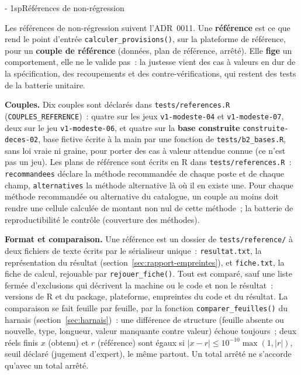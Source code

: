 \documentclass[a4paper,11pt]{article}
\makeatletter
\newcommand{\titrebandeau}[1]{%
  \noindent{\color{financeblue}\rule{\linewidth}{2.5pt}}
  \par\vspace{5mm}
  {\color{greenline}\raggedright\fontsize{19}{23}\bfseries\selectfont #1\par}
  \vspace{6mm}}
\newcommand{\charte@bandeau}[1]{%
  \parindent\z@ \everypar{\strut}%
  {\strut\par}\nobreak
  \titrebandeau{#1}\nobreak
  \kern\z@\nobreak\strut\par}
\newcommand{\charte@reserve}[1]{\par\ifinner\else\if@nobreak\else
  \penalty\z@ %
  \begingroup\setlength{\dimen@}{#1}%
  \dimen@ii\pagegoal \advance\dimen@ii-\pagetotal
  \ifdim\pagegoal=\maxdimen\else\ifdim\dimen@>\dimen@ii
    \vfil\penalty-\@M %
  \fi\fi\endgroup\fi\fi}
\renewcommand{\section}{\charte@reserve{12\baselineskip}%
  \@startsection{section}{1}{\z@}%
  {\z@}{1sp}{\normalfont\charte@bandeau}}
\newcommand{\code}[1]{\texttt{\small #1}}
\makeatother
\begin{document}
\section{Références de non-régression}
\label{sec:references}

Les références de non-régression suivent l'ADR~0011. Une \textbf{référence}
est ce que rend le point d'entrée \code{calculer\_provisions()}, sur la plateforme de
référence, pour un \textbf{couple de référence} (données, plan de
référence, arrêté). Elle \textbf{fige} un comportement, elle ne le valide
pas~: la justesse vient des cas à valeurs en dur de la spécification, des
recoupements et des contre-vérifications, qui restent des tests de la
batterie unitaire.

\textbf{Couples.} Dix couples sont déclarés dans \code{tests/references.R}
(\code{COUPLES\_REFERENCE})~: quatre sur les jeux \code{v1-modeste-04} et
\code{v1-modeste-07}, deux sur le jeu \code{v1-modeste-06}, et quatre sur
la \textbf{base construite} \code{construite-deces-02}, base fictive écrite
à la main par une fonction de \code{tests/b2\_bases.R}, sans loi vraie ni
graine, pour porter des cas à valeur attendue connue (ce n'est pas un jeu).
Les plans de référence sont écrits en R dans \code{tests/references.R}~:
\code{recommandees} déclare la méthode recommandée de chaque poste et de
chaque champ, \code{alternatives} la méthode alternative là où il en existe
une. Pour chaque méthode recommandée ou alternative du catalogue, un couple
au moins doit rendre une cellule calculée de montant non nul de cette
méthode~; la batterie de reproductibilité le contrôle (couverture des
méthodes).

\textbf{Format et comparaison.} Une référence est un dossier de
\code{tests/reference/} à deux fichiers de texte écrits par le sérialiseur
unique~: \code{resultat.txt}, la représentation du résultat
(section~\ref{sec:rapport-empreintes}), et \code{fiche.txt}, la fiche de
calcul, rejouable par \code{rejouer\_fiche()}. Tout est comparé, sauf une
liste fermée d'exclusions qui décrivent la machine ou le code et non le
résultat~: versions de R et du package, plateforme, empreintes du code et du
résultat. La comparaison se fait feuille par feuille, par la fonction
\code{comparer\_feuilles()} du harnais (section~\ref{sec:harnais})~: une différence de
structure (feuille absente ou nouvelle, type, longueur, valeur manquante
contre valeur) échoue toujours~; deux réels finis $x$ (obtenu) et $r$
(référence) sont égaux si $|x - r| \le 10^{-10} \max(1, |r|)$, seuil déclaré
(jugement d'expert), le même partout. Un total arrêté ne s'accorde qu'avec
un total arrêté.
\end{document}
